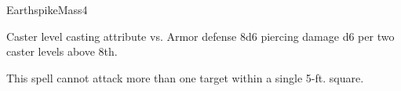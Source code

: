 \begin{spellsection}{Earthspike}{Mass}{4}
\begin{spellheader}
\end{spellheader}
\begin{spellcontent}
    \begin{spelltargetinginfo}
    \end{spelltargetinginfo}
    \begin{spelleffects}
        \begin{spellattack}{Caster level \add casting attribute vs. Armor defense}
            \spellsuccess 8d6 piercing damage \add d6 per two caster levels above 8th.
        \end{spellattack}
    \end{spelleffects}
\end{spellcontent}
\begin{spellfooter}
    \spellnotes This spell cannot attack more than one target within a single 5-ft. square.
\end{spellfooter}
\end{spellsection}

